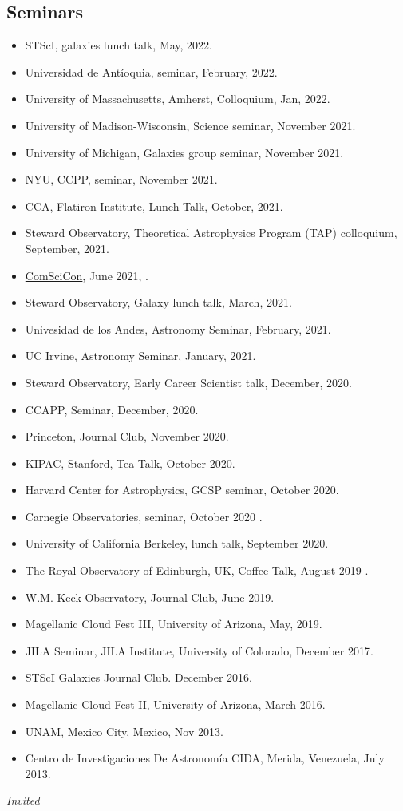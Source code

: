 \documentclass[UTF8]{article}
\begin{document}
\subsection*{Seminars}
\begin{itemize}
  \setlength\itemsep{0.0em}
  \renewcommand\labelitemi{$\cdot$}
\item STScI, galaxies lunch talk, May, 2022. \dag
\item Universidad de Ant\'ioquia, seminar, February, 2022. \dag 
\item University of Massachusetts, Amherst, Colloquium, Jan, 2022. \dag
\item University of Madison-Wisconsin, Science seminar, November 2021.\dag
\item University of Michigan, Galaxies group seminar, November 2021.\dag
\item NYU, CCPP, seminar, November 2021.\dag 
\item CCA, Flatiron Institute, Lunch Talk, October, 2021.
\item Steward Observatory, Theoretical Astrophysics Program (TAP) colloquium, September, 2021.\dag
\item \href{https://comscicon.com/comscicon-en-espa%C3%B1ol-2021}{ComSciCon}, June 2021, \dag. 
\item Steward Observatory, Galaxy lunch talk, March, 2021.
\item Univesidad de los Andes, Astronomy Seminar, February, 2021. 
\item UC Irvine, Astronomy Seminar, January, 2021. \dag
\item Steward Observatory, Early Career Scientist talk, December, 2020. \dag
\item CCAPP, Seminar, December, 2020. \dag
\item Princeton, Journal Club, November 2020. \dag
\item KIPAC, Stanford, Tea-Talk, October 2020.
\item Harvard Center for Astrophysics, GCSP seminar, October 2020.
\item Carnegie Observatories, seminar, October 2020 \dag.
\item University of California Berkeley, lunch talk, September 2020. 
\item The Royal Observatory of Edinburgh, UK, Coffee Talk, August 2019 \dag.
\item W.M. Keck Observatory, Journal Club, June 2019.
\item Magellanic Cloud Fest III, University of Arizona, May, 2019.
\item JILA Seminar, JILA Institute, University of Colorado, December 2017.
\item STScI Galaxies Journal Club. December 2016.
\item Magellanic Cloud Fest II, University of Arizona, March 2016.
\item UNAM, Mexico City, Mexico, Nov 2013. 
\item Centro de Investigaciones De Astronom\'ia CIDA, Merida, Venezuela, July 2013.
\end{itemize}
\indent \dag \textit{Invited}
\end{document}
